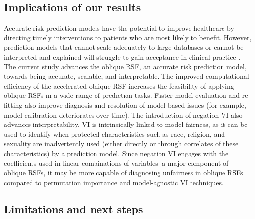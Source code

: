 \documentclass[twoside,11pt]{article}\usepackage[]{graphicx}\usepackage[]{xcolor}
\newcommand{\eg}{for example}
\begin{document}
\subsection{Implications of our results}

Accurate risk prediction models have the potential to improve healthcare by directing timely interventions to patients who are most likely to benefit. However, prediction models that cannot scale adequately to large databases or cannot be interpreted and explained will struggle to gain acceptance in clinical practice \citep{moss2022demystifying}. The current study advances the oblique RSF, an accurate risk prediction model, towards being accurate, scalable, and interpretable. The improved computational efficiency of the accelerated oblique RSF increases the feasibility of applying oblique RSFs in a wide range of prediction tasks. Faster model evaluation and re-fitting also improve diagnosis and resolution of model-based issues (\eg, model calibration deteriorates over time). The introduction of negation VI also advances interpretability. VI is intrinsically linked to model fairness, as it can be used to identify when protected characteristics such as race, religion, and sexuality are inadvertently used (either directly or through correlates of these characteristics) by a prediction model. Since negation VI engages with the coefficients used in linear combinations of variables, a major component of oblique RSFs, it may be more capable of diagnosing unfairness in oblique RSFs compared to permutation importance and model-agnostic VI techniques.

\subsection{Limitations and next steps}
\end{document}
